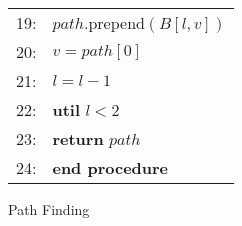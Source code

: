 \documentclass{sig-alternate-05-2015}
\begin{document}
\begin{figure}
\begin{tabular}{rl}
19:&\hspace{20pt}     $path$.prepend$(B[l, v])$ \\
20:&\hspace{20pt}     $v = path[0]$ \\
21:&\hspace{20pt}     $l = l - 1$ \\
22:&\hspace{10pt} \textbf{util} $l < 2$ \\
23:&\hspace{10pt} \textbf{return} $path$ \\
24:&\textbf{end procedure} \\
\hline
\end{tabular}
\caption{Path Finding}
\label{fig:path}
\end{figure}





\end{document}
